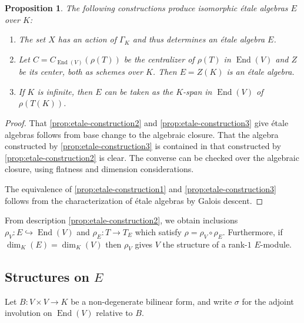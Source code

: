 \documentclass{article}
\theoremstyle{plain}
\newtheorem{proposition}[theorem]{Proposition}
\theoremstyle{definition}
\numberwithin{equation}{section}
\DeclareMathOperator{\End}{End}
\newcommand{\GalKbK}{\Gamma_K}
\begin{document}
\begin{proposition} \label{prop:etale-construction}
The following constructions produce isomorphic \'etale algebras $E$ over $K$:
\begin{enumerate}
\item \label{prop:etale-construction1} The set $X$ has an action of $\GalKbK$ and thus determines an \'etale algebra $E$.
\item \label{prop:etale-construction2} Let $C = C_{\End(V)}(\rho(T))$ be the centralizer of $\rho(T)$ in $\End(V)$ and $Z$ be its center, both as schemes over $K$.  Then $E = Z(K)$ is an \'etale algebra.
\item \label{prop:etale-construction3} If $K$ is infinite, then $E$ can be taken as the $K$-span in $\End(V)$ of $\rho(T(K))$.
\end{enumerate}
\end{proposition}
\begin{proof}
That \eqref{prop:etale-construction2} and \eqref{prop:etale-construction3} give \'etale algebras follows from base change to the algebraic closure.
That the algebra constructed by \eqref{prop:etale-construction3} is contained in that constructed by \eqref{prop:etale-construction2} is clear.
The converse can be checked over the algebraic closure, using flatness and dimension considerations.

The equivalence of \eqref{prop:etale-construction1} and \eqref{prop:etale-construction3} follows from the characterization of \'etale algebras by Galois descent.
\end{proof}

From description \eqref{prop:etale-construction2}, we obtain inclusions $\rho_V : E \hookrightarrow \End(V)$ and $\rho_E : T \rightarrow T_E$ which satisfy $\rho = \rho_V \circ\rho_E$.  Furthermore, if $\dim_K(E) = \dim_K(V)$ then $\rho_V$ gives $V$ the structure of a rank-$1$ $E$-module.

\subsection{Structures on $E$}

Let $B : V \times V \rightarrow K$ be a non-degenerate bilinear form, and write $\sigma$ for the adjoint involution on $\End(V)$ relative to $B$.
\end{document}
